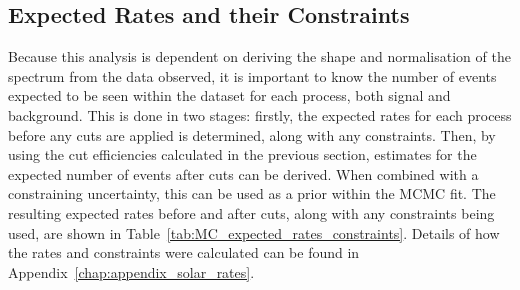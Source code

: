 \subsection{Expected Rates and their Constraints}\label{sec:exp_rates_constraints}
Because this analysis is dependent on deriving the shape and normalisation of the \beight{} spectrum from the data observed, it is important to know the number of events expected to be seen within the dataset for each process, both signal and background. This is done in two stages: firstly, the expected rates for each process before any cuts are applied is determined, along with any constraints. Then, by using the cut efficiencies calculated in the previous section, estimates for the expected number of events after cuts can be derived. When combined with a constraining uncertainty, this can be used as a prior within the MCMC fit. The resulting expected rates before and after cuts, along with any constraints being used, are shown in Table~\ref{tab:MC_expected_rates_constraints}. Details of how the rates and constraints were calculated can be found in Appendix~\ref{chap:appendix_solar_rates}.

